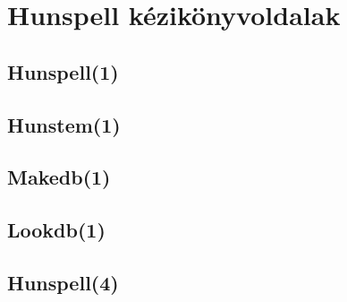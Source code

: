 
\chapter{Hunspell kézikönyvoldalak}

\section{Hunspell(1)}



\section{Hunstem(1)}



\section{Makedb(1)}



\section{Lookdb(1)}



\section{Hunspell(4)}



